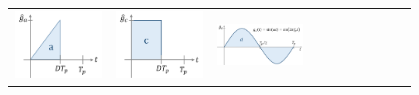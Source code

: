 \documentclass[10pt,landscape]{scrartcl}
\begin{document}
\begin{multicols}{2}
\begin{tabular}{p{0.2\linewidth} p{0.2\linewidth} p{0.2\linewidth} p{0.2\linewidth} }
  \includegraphics[width=1.0\linewidth]{img/rms/signal_a.png}%
  &
  \includegraphics[width=1.0\linewidth]{img/rms/signal_c.png}%
  &
  \includegraphics[width=1.0\linewidth]{img/rms/signal_d.png}%

\end{tabular}
\end{multicols}
\end{document}
